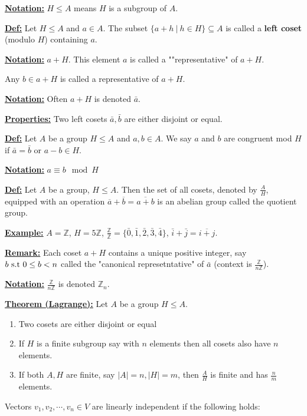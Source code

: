 \documentclass{article}
\renewcommand{\b}[1]{\textbf{#1}}
\newcommand{\ul}[1]{\underline{#1}}
\newcommand{\newdef}[2]{\b{\ul{#1:}} #2}
\newcommand{\st}{\textnormal{ s.t }}
\begin{document}
\newdef{Notation}{$H \leq A$ means $H$ is a subgroup of $A$.}

\newdef{Def}{
	Let $H \leq A$ and $a \in A$. The subset
	$\{a+h\ |\ h \in H\} \subseteq A$ is called a \b{left coset}
	(modulo $H$) containing $a$.
}

\newdef{Notation}{
	$a+H$. This element $a$ is called a ""representative" of $a+H$.

	Any $b \in a+H$ is called a representative of $a+H$.
}

\newdef{Notation}{Often $a+H$ is denoted $\bar{a}$.}

\newdef{Properties}{
	Two left cosets $\bar{a}, \bar{b}$ are either disjoint or equal.
}

\newdef{Def}{
	Let $A$ be a group $H \leq A$ and $a, b \in A$. We say $a$ and $b$ are
	congruent mod $H$ if $\bar{a} = \bar{b}$ or $a - b \in H$.
}

\newdef{Notation}{$a \equiv b\mod H$}

\newdef{Def}{
	Let $A$ be a group, $H \leq A$. Then the set of all cosets, denoted by
	$\frac{A}{H}$, equipped with an operation $\overline{a}+\overline{b} =
		\overline{a+b}$ is an abelian group called the quotient group.
}

\newdef{Example}{
	$A = \mathbb{Z}$, $H = 5\mathbb{Z}$,
	$\frac{\mathbb{Z}}{\mathbb{Z}} = \{\bar{0}, \bar{1}, \bar{2}, \bar{3},
		\bar{4}\}$, $\bar{i}+\bar{j}=\overline{i+j}$.
}

\newdef{Remark}{
	Each coset $a+H$ contains a unique positive integer, say
	$b \st 0 \leq b < n$ called the "canonical represetntative" of
	$\bar{a}$ (context is $\frac{\mathbb{Z}}{n\mathbb{Z}}$).
}

\newdef{Notation}{$\frac{\mathbb{Z}}{n\mathbb{Z}}$ is denoted $\mathbb{Z}_n$.}

\newdef{Theorem (Lagrange)}{
	Let $A$ be a group $H \leq A$.

	\begin{enumerate}
		\item Two cosets are either disjoint or equal
		\item If $H$ is a finite subgroup say with $n$ elements then
		      all cosets also have $n$ elements.
		\item If both $A, H$ are finite, say $|A| = n, |H| = m$, then
		      $\frac{A}{H}$ is finite and has $\frac{n}{m}$ elements.
	\end{enumerate}
}

Vectors $v_1, v_2, \cdots, v_n \in V$ are linearly independent if the following
holds:
\end{document}
